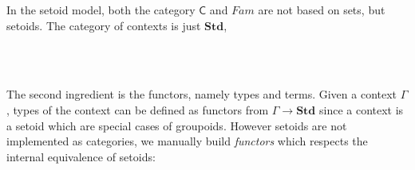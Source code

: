 In the setoid model, both the category $\mathsf{C}$ and $Fam$ are not based on sets, but setoids.
The category of contexts is just $\textbf{Std}$,

\begin{code}
%
\\
\> \AgdaSymbol{=} \<%
\\
\end{code}

The second ingredient is the functors, namely types and terms.
Given a context $\Gamma$, types of the context can be defined as functors from $\Gamma \to \textbf{Std}$ since a context is a setoid which are special cases of groupoids. However setoids are not implemented as categories, we manually build \emph{functors} which respects the internal equivalence of setoids:

